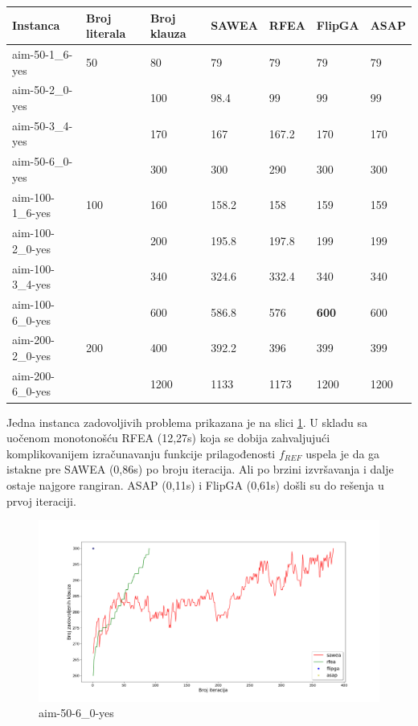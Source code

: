 \documentclass[a4paper]{article}
\begin{document}
\begin{table}[h!]
\centering
{}\label{tab:ea_SAT} 
\begin{tabular}{ |p{2.5cm}|p{1.4cm}|p{1.4cm}||p{1.6cm}|p{1.6cm}|p{1.6cm}|p{1.6cm}|}
\hline
 Instanca & Broj \break literala & Broj \break klauza & SAWEA & RFEA & FlipGA & ASAP \\ 
 \hline
 aim-50-1\_6-yes & 50 & 80 & 79 & 79 & 79 &  79 \\ 
 aim-50-2\_0-yes &  & 100 &  98.4 &  99 & 99 & 99 \\ 
 aim-50-3\_4-yes &  & 170 & 167 & 167.2 & 170 & 170  \\ 
 aim-50-6\_0-yes &  & 300 &  300 & 290 &  300 &  300 \\ 
 \hline
 aim-100-1\_6-yes & 100 & 160 & 158.2 & 158 &  159 & 159 \\ 
 aim-100-2\_0-yes &  & 200 & 195.8 &  197.8 & 199 &  199 \\ 
 aim-100-3\_4-yes &  & 340 & 324.6  & 332.4 & 340 & 340 \\ 
 aim-100-6\_0-yes &  & 600 &  586.8 & 576 & \textbf{600} & 600 \\ 
 \hline
 aim-200-2\_0-yes & 200 & 400 &  392.2 & 396 & 399 & 399 \\ 
 aim-200-6\_0-yes &  & 1200 & 1133 & 1173 &  1200 & 1200 \\ 
 \hline
\end{tabular} 
\end{table}


Jedna instanca zadovoljivih problema prikazana je na slici \ref{img:ea_yes1}.
U skladu sa uočenom monotonošću RFEA (12,27s) koja se dobija zahvaljujući komplikovanijem
izračunavanju funkcije prilagođenosti $f_{REF}$ uspela je da ga istakne pre 
SAWEA (0,86s) po broju iteracija. Ali po brzini
izvršavanja i dalje ostaje najgore rangiran. ASAP (0,11s) i FlipGA (0,61s) 
došli su do rešenja u prvoj iteraciji. \\

\begin{figure}[h!]
\centering
\includegraphics[width=\textwidth]{ea-aim-50-6_0-yes}
\caption{aim-50-6\_0-yes}\label{img:ea_yes1}
\end{figure}
\end{document}

